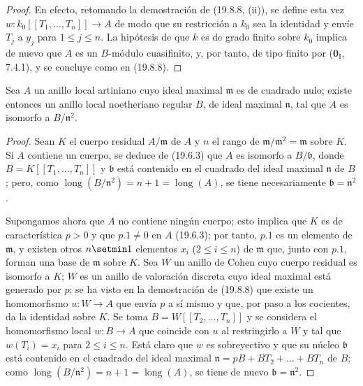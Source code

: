 \begin{proof}
En efecto, retomando la demostración de (19.8.8, (ii)), se define esta vez
$w:k_0[[T_1,\ldots,T_n]]\to A$ de modo que su restricción a $k_0$ sea la
identidad y envíe $T_j$ a $y_j$ para $1\leq j\leq n$. La hipótesis de que $k$ es de
grado finito sobre $k_0$ implica de nuevo que $A$ es un $B$-módulo cuasifinito,
y, por tanto, de tipo finito por ($\mathbf 0_{\mathrm I}$, 7.4.1), y se
concluye como en (19.8.8).
\end{proof}

\begin{corollary}[19.8.10]
\label{0.19.8.10-fr}
Sea $A$ un anillo local artiniano cuyo ideal maximal $\mathfrak m$ es de
cuadrado nulo; existe entonces un anillo local noetheriano regular $B$, de
ideal maximal $\mathfrak n$, tal que $A$ es isomorfo a
$B/\mathfrak n^2$.
\end{corollary}

\begin{proof}
Sean $K$ el cuerpo residual $A/\mathfrak m$ de $A$ y $n$ el rango de
$\mathfrak m/\mathfrak m^2=\mathfrak m$ sobre $K$. Si $A$ contiene un cuerpo,
se deduce de (19.6.3) que $A$ es isomorfo a $B/\mathfrak b$, donde
$B=K[[T_1,\ldots,T_n]]$ y $\mathfrak b$ está contenido en el cuadrado del
ideal maximal $\mathfrak n$ de $B$; pero, como
$\operatorname{long}(B/\mathfrak n^2)=n+1=\operatorname{long}(A)$, se tiene
necesariamente $\mathfrak b=\mathfrak n^2$.

Supongamos ahora que $A$ no contiene ningún cuerpo; esto implica que $K$ es
de característica $p>0$ y que $p.1\neq0$ en $A$ (19.6.3); por tanto,
$p.1$ es un elemento de $\mathfrak m$, y existen otros $n\setmin 1$ elementos
$x_i$ ($2\leq i\leq n$) de $\mathfrak m$ que, junto con $p.1$, forman una
base de $\mathfrak m$ sobre $K$. Sea $W$ un anillo de Cohen cuyo cuerpo
residual es isomorfo a $K$; $W$ es un anillo de valoración discreta cuyo ideal
maximal está generado por $p$; se ha visto en la demostración de (19.8.8) que
existe un homomorfismo $u:W\to A$ que envía $p$ a sí mismo y que, por paso
a los cocientes, da la identidad sobre $K$. Se toma
$B=W[[T_2,\ldots,T_n]]$ y se considera el homomorfismo local $w:B\to A$ que
coincide con $u$ al restringirlo a $W$ y tal que $w(T_i)=x_i$ para $2\leq i\leq n$. Está
claro que $w$ es sobreyectivo y que su núcleo $\mathfrak b$ está contenido en
el cuadrado del ideal maximal $\mathfrak n=pB+BT_2+\ldots+BT_n$ de $B$; como
$\operatorname{long}(B/\mathfrak n^2)=n+1=\operatorname{long}(A)$, se tiene
de nuevo $\mathfrak b=\mathfrak n^2$.
\end{proof}

